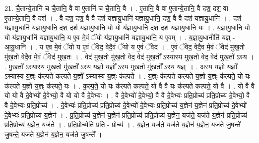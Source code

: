 \documentclass[17pt]{extarticle}
\begin{document}
21. चै॒तान्ये॒तानि॑ च चै॒तानि॒ वै वा ए॒तानि॑ च चै॒तानि॒ वै । . ए॒तानि॒ वै वा ए॒तान्ये॒तानि॒ वै दश॒ दश॒ वा ए॒तान्ये॒तानि॒ वै दश॑ । . वै दश॒ दश॒ वै वै दश॑ यज्ञायु॒धानि॑ यज्ञायु॒धानि॒ दश॒ वै वै दश॑ यज्ञायु॒धानि॑ । . दश॑ यज्ञायु॒धानि॑ यज्ञायु॒धानि॒ दश॒ दश॑ यज्ञायु॒धानि॒ यो यो य॑ज्ञायु॒धानि॒ दश॒ दश॑ यज्ञायु॒धानि॒ यः । . य॒ज्ञा॒यु॒धानि॒ यो यो य॑ज्ञायु॒धानि॑ यज्ञायु॒धानि॒ य ए॒व मे॒वं ॅयो य॑ज्ञायु॒धानि॑ यज्ञायु॒धानि॒ य ए॒वम् । . य॒ज्ञा॒यु॒धानीति॑ यज्ञ् - आ॒यु॒धानि॑ । . य ए॒व मे॒वं ॅयो य ए॒वं ॅवेद॒ वेदै॒वं ॅयो य ए॒वं ॅवेद॑ । . ए॒वं ॅवेद॒ वेदै॒व मे॒वं ॅवेद॑ मुख॒तो मु॑ख॒तो वेदै॒व मे॒वं ॅवेद॑ मुख॒तः । . वेद॑ मुख॒तो मु॑ख॒तो वेद॒ वेद॑ मुख॒तो᳚ ऽस्यास्य मुख॒तो वेद॒ वेद॑ मुख॒तो᳚ ऽस्य । . मु॒ख॒तो᳚ ऽस्यास्य मुख॒तो मु॑ख॒तो᳚ ऽस्य य॒ज्ञो य॒ज्ञो᳚ ऽस्य मुख॒तो मु॑ख॒तो᳚ ऽस्य य॒ज्ञ्ः । . अ॒स्य॒ य॒ज्ञो य॒ज्ञो᳚ ऽस्यास्य य॒ज्ञ्ः क॑ल्पते कल्पते य॒ज्ञो᳚ ऽस्यास्य य॒ज्ञ्ः क॑ल्पते । . य॒ज्ञ्ः क॑ल्पते कल्पते य॒ज्ञो य॒ज्ञ्ः क॑ल्पते॒ यो यः क॑ल्पते य॒ज्ञो य॒ज्ञ्ः क॑ल्पते॒ यः । . क॒ल्प॒ते॒ यो यः क॑ल्पते कल्पते॒ यो वै वै यः क॑ल्पते कल्पते॒ यो वै । . यो वै वै यो यो वै दे॒वेभ्यो॑ दे॒वेभ्यो॒ वै यो यो वै दे॒वेभ्यः॑ । . वै दे॒वेभ्यो॑ दे॒वेभ्यो॒ वै वै दे॒वेभ्यः॑ प्रति॒प्रोच्य॑ प्रति॒प्रोच्य॑ दे॒वेभ्यो॒ वै वै दे॒वेभ्यः॑ प्रति॒प्रोच्य॑ । . दे॒वेभ्यः॑ प्रति॒प्रोच्य॑ प्रति॒प्रोच्य॑ दे॒वेभ्यो॑ दे॒वेभ्यः॑ प्रति॒प्रोच्य॑ य॒ज्ञेन॑ य॒ज्ञेन॑ प्रति॒प्रोच्य॑ दे॒वेभ्यो॑ दे॒वेभ्यः॑ प्रति॒प्रोच्य॑ य॒ज्ञेन॑ । . प्र॒ति॒प्रोच्य॑ य॒ज्ञेन॑ य॒ज्ञेन॑ प्रति॒प्रोच्य॑ प्रति॒प्रोच्य॑ य॒ज्ञेन॒ यज॑ते॒ यज॑ते य॒ज्ञेन॑ प्रति॒प्रोच्य॑ प्रति॒प्रोच्य॑ य॒ज्ञेन॒ यज॑ते । . प्र॒ति॒प्रोच्येति॑ प्रति - प्रोच्य॑ । . य॒ज्ञेन॒ यज॑ते॒ यज॑ते य॒ज्ञेन॑ य॒ज्ञेन॒ यज॑ते जु॒षन्ते॑ जु॒षन्ते॒ यज॑ते य॒ज्ञेन॑ य॒ज्ञेन॒ यज॑ते जु॒षन्ते᳚ । \newline
\end{document}
